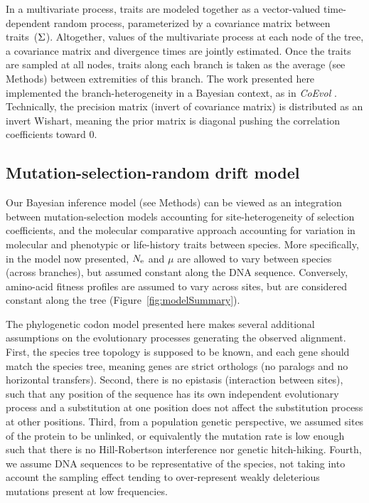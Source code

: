 In a multivariate process, traits are modeled together as a vector-valued time-dependent random process, parameterized by a covariance matrix between traits~($\Sigma$).
Altogether, values of the multivariate process at each node of the tree, a covariance matrix and divergence times are jointly estimated.
Once the traits are sampled at all nodes, traits along each branch is taken as the average (see Methods) between extremities of this branch.
The work presented here implemented the branch-heterogeneity in a Bayesian context, as in \textit{CoEvol} \citep{Lartillot2011}.
Technically, the precision matrix (invert of covariance matrix) is distributed as an invert Wishart, meaning the \gls{prior} matrix is diagonal pushing the correlation coefficients toward $0$.

\subsection{Mutation-selection-random drift model}
\label{sec:BranchSiteHetero}
Our Bayesian inference model (see Methods) can be viewed as an integration between mutation-selection models accounting for site-heterogeneity of selection coefficients, and the molecular comparative approach accounting for variation in molecular and phenotypic or life-history traits between species.
More specifically, in the model now presented, $N_{\mathrm{e}}$ and $\mu$ are allowed to vary between species (across branches), but assumed constant along the \acrshort{DNA} sequence.
Conversely, amino-acid fitness profiles are assumed to vary across sites, but are considered constant along the tree (Figure~\ref{fig:modelSummary}).

The phylogenetic \gls{codon} model presented here makes several additional assumptions on the evolutionary processes generating the observed alignment.
First, the species tree topology is supposed to be known, and each gene should match the species tree, meaning genes are strict orthologs (no paralogs and no horizontal transfers).
Second, there is no epistasis (interaction between sites), such that any position of the sequence has its own independent evolutionary process and a \gls{substitution} at one position does not affect the \gls{substitution} process at other positions.
Third, from a population genetic perspective, we assumed sites of the protein to be unlinked, or equivalently the mutation rate is low enough such that there is no Hill-Robertson interference nor genetic hitch-hiking.
Fourth, we assume \acrshort{DNA} sequences to be representative of the species, not taking into account the sampling effect tending to over-represent weakly deleterious mutations present at low frequencies.



